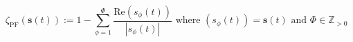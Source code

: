 \begin{equation}
	\zeta_\text{PF}(\textbf{s}(t)):= 1 - \sum_{\phi=1}^{\Phi}\frac{\text{Re}(s_\phi(t))}{|s_\phi(t)|}  \text{ where } (s_\phi(t)) = \textbf{s}(t) \text{ and } \Phi \in \mathbb{Z}_{>0}
\label{ch1:equ:power-factor}
\end{equation}